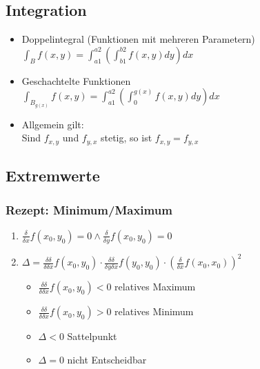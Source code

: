 \subsection{Integration}
\begin{itemize}
	\item Doppelintegral (Funktionen mit mehreren Parametern) \\
	$\int_B f(x, y) = \int_{a1}^{a2}(\int_{b1}^{b2} f(x, y) dy) dx$

	\item Geschachtelte Funktionen \\
	$\int_{B_{g(x)}} f(x, y) = \int_{a1}^{a2}(\int_0^{g(x)} f(x, y) dy) dx$

	\item Allgemein gilt: \\
	Sind $f_{x,y}$ und $f_{y,x}$ stetig, so ist $f_{x,y} = f_{y,x}$
\end{itemize}

\subsection{Extremwerte}
\subsubsection{Rezept: Minimum/Maximum}
\begin{enumerate}
	\item $\frac{\delta}{\delta x}f(x_0,y_0) = 0 \wedge \frac{\delta}{\delta y}f(x_0,y_0) = 0$

	\item $\Delta = \frac{\delta \delta}{\delta \delta x}f(x_0,y_0) \cdot \frac{\delta \delta}{\delta y \delta x}f(y_0,y_0) \cdot (\frac{\delta}{\delta x}f(x_0,x_0))^2$
	\begin{itemize}
		\item $\frac{\delta \delta}{\delta \delta x}f(x_0,y_0) < 0$ relatives Maximum
		\item $\frac{\delta \delta}{\delta \delta x}f(x_0,y_0) > 0$ relatives Minimum
		\item $\Delta < 0$ Sattelpunkt
		\item $\Delta = 0$ nicht Entscheidbar
	\end{itemize}
\end{enumerate}
